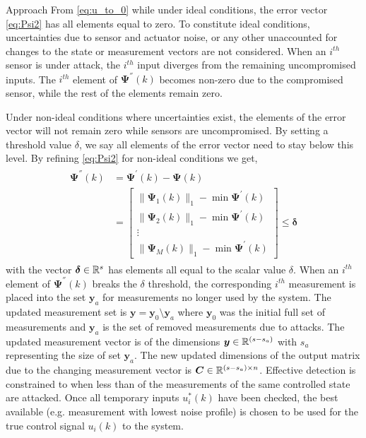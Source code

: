 \begin{section}{Approach}
From \eqref{eq:u_to_0} while under ideal conditions, the error vector \eqref{eq:Psi2} has all elements equal to zero. To constitute ideal conditions, uncertainties due to sensor and actuator noise, or any other unaccounted for changes to the state or measurement vectors are not considered. When an $i^{th}$ sensor is under attack, the $i^{th}$ input diverges from the remaining uncompromised inputs. The $i^{th}$ element of $\bm{\Psi}^{''}(k)$ becomes non-zero due to the compromised sensor, while the rest of the elements remain zero. 

Under non-ideal conditions where uncertainties exist, the elements of the error vector will not remain zero while sensors are uncompromised. By setting a threshold value $\delta$, we say all elements of the error vector need to stay below this level. By refining \eqref{eq:Psi2} for non-ideal conditions we get,
    \begin{align}
    \begin{split}
    \label{eq:Psi2_nonideal}
	\bm{\Psi^{''}}(k)&=\bm{\Psi^{'}}(k)-\bm{\Psi}(k) \\
	& =\begin{bmatrix} \lVert{\bm{\Psi}_1(k)}\rVert_1 - \min \bm{\Psi}^{'}(k)\\ \lVert{\bm{\Psi}_2(k)}\rVert_1 - \min \bm{\Psi}^{'}(k) \\ \vdots \\ \lVert{\bm{\Psi}_M(k)}\rVert_1 - \min \bm{\Psi}^{'}(k) \end{bmatrix} \leq \bm{\delta}
	\end{split}
	\end{align}
with the vector $\bm{\delta} \in \mathbb{R}^s$ has elements all equal to the scalar value $\delta$. When an $i^{th}$ element of $\bm{\Psi^{''}}(k)$ breaks the $\delta$ threshold, the corresponding $i^{th}$ measurement is placed into the set $\bm{y}_a$ for measurements no longer used by the system. The updated measurement set is $\bm{y}=\bm{y}_0\setminus\bm{y}_a$ where $\bm{y}_0$ was the initial full set of measurements and $\bm{y}_a$ is the set of removed measurements due to attacks. The updated measurement vector is of the dimensions $\bm{y} \in \mathbb{R}^{(s-s_{a})}$ with $s_a$ representing the size of set $\bm{y}_a$. The new updated dimensions of the output matrix due to the changing measurement vector is $\bm{C} \in \mathbb{R}^{(s-s_a)\times n}$. Effective detection is constrained to when less than of the measurements of the same controlled state are attacked. Once all temporary inputs $u_i^*(k)$ have been checked, the best available (e.g. measurement with lowest noise profile) is chosen to be used for the true control signal $u_i(k)$ to the system.




\end{section}
